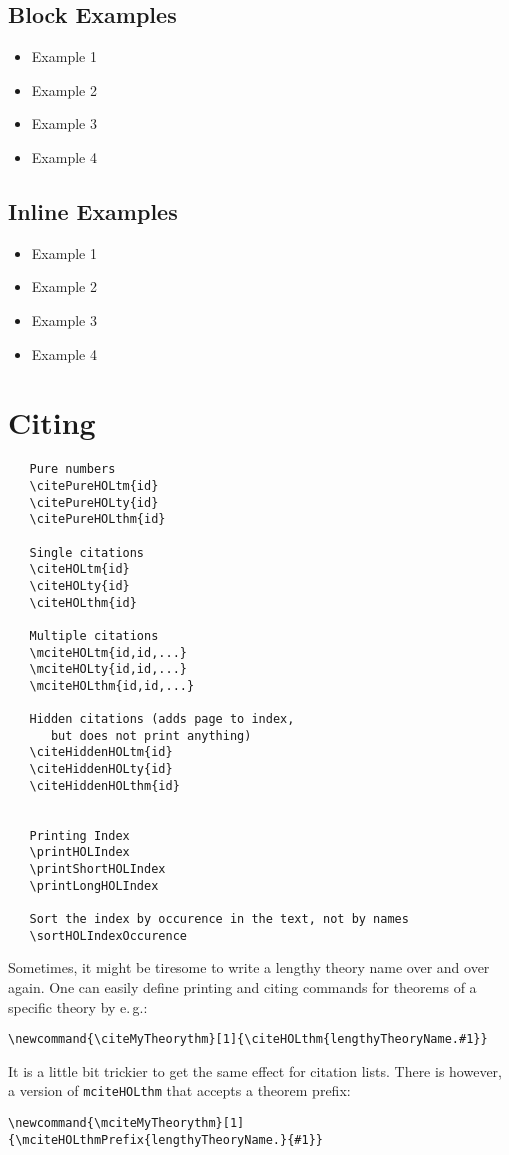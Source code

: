 \documentclass{scrartcl}
\begin{document}
\subsection{Block Examples}
\begin{itemize}
\item Example 1 
\item Example 2 
\item Example 3 
\item Example 4 
\end{itemize}


\subsection{Inline Examples}
\begin{itemize}
\item Example 1 
\item Example 2 
\item Example 3 
\item Example 4 
\end{itemize}



\section{Citing}

\begin{verbatim}
   Pure numbers
   \citePureHOLtm{id}
   \citePureHOLty{id}
   \citePureHOLthm{id}

   Single citations
   \citeHOLtm{id}
   \citeHOLty{id}
   \citeHOLthm{id}

   Multiple citations
   \mciteHOLtm{id,id,...}
   \mciteHOLty{id,id,...}
   \mciteHOLthm{id,id,...}

   Hidden citations (adds page to index,
      but does not print anything)
   \citeHiddenHOLtm{id}
   \citeHiddenHOLty{id}
   \citeHiddenHOLthm{id}


   Printing Index
   \printHOLIndex
   \printShortHOLIndex
   \printLongHOLIndex

   Sort the index by occurence in the text, not by names
   \sortHOLIndexOccurence
\end{verbatim}

Sometimes, it might be tiresome to write a lengthy theory name over and over again.
One can easily define printing and citing commands for theorems of a specific
theory by e.\,g.:
\begin{verbatim}
\newcommand{\citeMyTheorythm}[1]{\citeHOLthm{lengthyTheoryName.#1}}
\end{verbatim}
It is a little bit trickier to get the same effect for citation lists. There is however,
a version of \texttt{mciteHOLthm} that accepts a theorem prefix:
\begin{verbatim}
\newcommand{\mciteMyTheorythm}[1]{\mciteHOLthmPrefix{lengthyTheoryName.}{#1}}
\end{verbatim}
\end{document}
